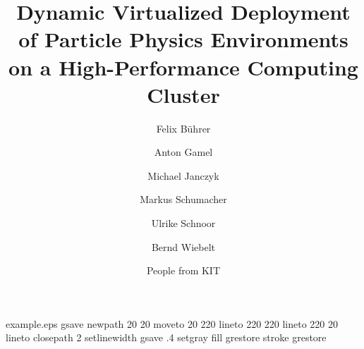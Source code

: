 %
%
%
%
%
\begin{filecontents*}{example.eps}
gsave
newpath
  20 20 moveto
  20 220 lineto
  220 220 lineto
  220 20 lineto
closepath
2 setlinewidth
gsave
  .4 setgray fill
grestore
stroke
grestore
\end{filecontents*}
%
\RequirePackage{fix-cm}
%
\documentclass[twocolumn]{svjour3}          %
%
\smartqed  %
%
\usepackage{graphicx}
%
%
\usepackage{url}
%
%
%


\title{Dynamic Virtualized Deployment of Particle Physics Environments on a
  High-Performance Computing Cluster%
}


\author{Felix B\"uhrer \and Anton Gamel  \and Michael Janczyk \and
  Markus Schumacher \and
  Ulrike Schnoor \and Bernd Wiebelt \and People from KIT
}

